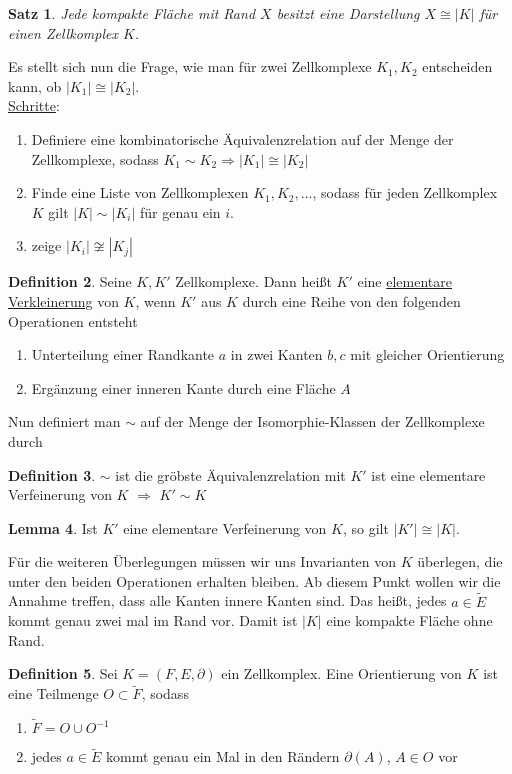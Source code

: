 \documentclass[a4paper, 12pt]{article}
\theoremstyle{plain}
\newtheorem{theorem}{Satz}[section] %
\theoremstyle{definition}
\newtheorem{definition}[theorem]{Definition} %
\theoremstyle{lemma}
\newtheorem{lemma}[theorem]{Lemma}
\theoremstyle{remark}
\theoremstyle{corollary}
\theoremstyle{example}
\begin{document}
	\begin{theorem}
		Jede kompakte Fläche mit Rand $X$ besitzt eine Darstellung $X \cong \left|K\right|$ für einen Zellkomplex $K$.
	\end{theorem}
	Es stellt sich nun die Frage, wie man für zwei Zellkomplexe $K_1,K_2$ entscheiden kann, ob $\left|K_1\right| \cong \left|K_2\right|$.\\
	\underline{Schritte}: \begin{enumerate}
		\item Definiere eine kombinatorische Äquivalenzrelation auf der Menge der Zellkomplexe, sodass $K_1\sim K_2 \Rightarrow\left|K_1\right| \cong \left|K_2\right|$
		\item Finde eine Liste von Zellkomplexen $K_1,K_2,...$, sodass für jeden Zellkomplex $K$ gilt $\left|K\right| \sim \left|K_i\right|$ für genau ein $i$.
		\item zeige $\left|K_i\right| \not \cong \left|K_j\right|$
	\end{enumerate}
	\begin{definition}
		Seine $K,K'$ Zellkomplexe. Dann heißt $K'$ eine \underline{elementare Verkleinerung} von $K$, wenn $K'$ aus $K$ durch eine Reihe von den folgenden Operationen entsteht
		\begin{enumerate}
			\item Unterteilung einer Randkante $a$ in zwei Kanten $b,c$ mit gleicher Orientierung
			\item Ergänzung einer inneren Kante durch eine Fläche $A$
		\end{enumerate} 
	\end{definition}
	Nun definiert man $\sim$ auf der Menge der Isomorphie-Klassen der Zellkomplexe durch \begin{definition}
		$\sim$ ist die gröbste Äquivalenzrelation mit $K'$ ist eine elementare Verfeinerung von $K$ $\Rightarrow$ $K' \sim K$
	\end{definition}
	\begin{lemma}
		Ist $K'$ eine elementare Verfeinerung von $K$, so gilt $\left|K'\right| \cong \left|K\right|$.
	\end{lemma}
	Für die weiteren Überlegungen müssen wir uns Invarianten von $K$ überlegen, die unter den beiden Operationen erhalten bleiben. Ab diesem Punkt wollen wir die Annahme treffen, dass alle Kanten innere Kanten sind. Das heißt, jedes $a \in \tilde{E}$ kommt genau zwei mal im Rand vor. Damit ist $\left|K\right|$ eine kompakte Fläche ohne Rand.
	\begin{definition}
		Sei $K = (F,E,\partial)$ ein Zellkomplex. Eine Orientierung von $K$ ist eine Teilmenge $O\subset \tilde{F}$, sodass
		\begin{enumerate}
			\item $\tilde{F} = O \cup O^{-1}$
			\item jedes $a \in \tilde{E}$ kommt genau ein Mal in den Rändern $\partial(A)$, $A \in O$ vor
		\end{enumerate}
	\end{definition}
\end{document}
